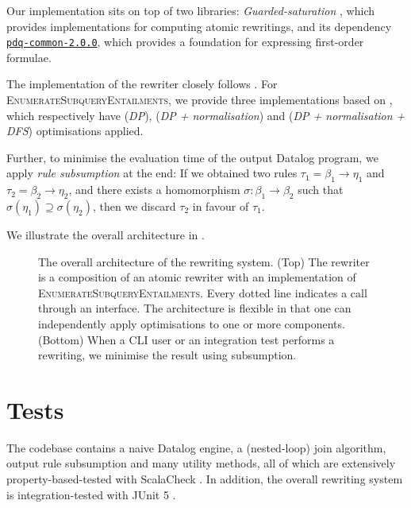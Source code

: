 \documentclass[12pt]{report}
\theoremstyle{plain}
\theoremstyle{definition}
\begin{document}
Our implementation sits on top of two libraries: \emph{Guarded-saturation} \cite{Benedikt_Rewriting_the_Infinite}, which provides implementations for computing atomic rewritings, and its dependency \href{https://github.com/ProofDrivenQuerying/pdq/releases/tag/v2.0.0}{\texttt{pdq-common-2.0.0}}, which provides a foundation for expressing first-order formulae.

The implementation of the rewriter closely follows . For \\ \textsc{EnumerateSubqueryEntailments}, we provide three implementations based on , which respectively have (\emph{DP}), (\emph{DP + normalisation}) and (\emph{DP + normalisation + DFS}) optimisations applied.

Further, to minimise the evaluation time of the output Datalog program, we apply \emph{rule subsumption} at the end: If we obtained two rules $\tau_1 = \beta_1 \rightarrow \eta_1$ and $\tau_2 = \beta_2 \rightarrow \eta_2$, and there exists a homomorphism $\sigma: \beta_1 \rightarrow \beta_2$ such that $\sigma(\eta_1) \supseteq \sigma(\eta_2)$, then we discard $\tau_2$ in favour of $\tau_1$.

We illustrate the overall architecture in .

\begin{figure}[h]
\centering

\caption{The overall architecture of the rewriting system. (Top) The rewriter is a composition of an atomic rewriter with an implementation of \textsc{EnumerateSubqueryEntailments}. Every dotted line indicates a call through an interface. The architecture is flexible in that one can independently apply optimisations to one or more components. (Bottom) When a CLI user or an integration test performs a rewriting, we minimise the result using subsumption.}
\label{figure:implementation-architecture}
\end{figure}

\section{Tests}
\label{section:tests}

The codebase contains a naive Datalog engine, a (nested-loop) join algorithm, output rule subsumption and many utility methods, all of which are extensively property-based-tested with ScalaCheck \cite{scalacheck}. In addition, the overall rewriting system is integration-tested with JUnit 5 \cite{junit}.
\end{document}
